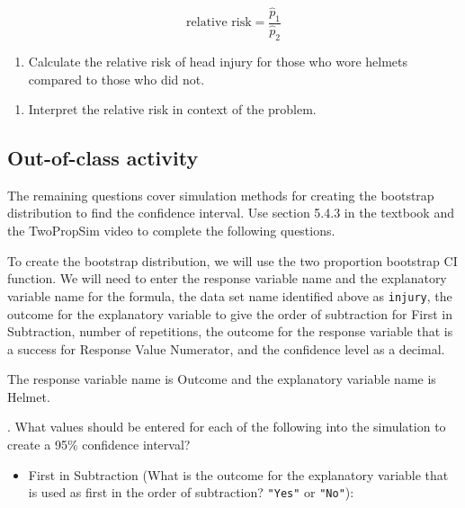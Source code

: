 \documentclass[
]{report}
\providecommand{\tightlist}{%
  \setlength{\itemsep}{0pt}\setlength{\parskip}{0pt}}
\begin{document}
\[\text{relative risk} = \frac{\hat{p}_1}{\hat{p}_2}\]

\begin{enumerate}
\def\labelenumi{\arabic{enumi}.}
\setcounter{enumi}{13}
\tightlist
\item
  Calculate the relative risk of head injury for those who wore helmets compared to those who did not.
\end{enumerate}

\vspace{1in}

\begin{enumerate}
\def\labelenumi{\arabic{enumi}.}
\setcounter{enumi}{14}
\tightlist
\item
  Interpret the relative risk in context of the problem.
\end{enumerate}

\vspace{1in}

\hypertarget{out-of-class-activity-8}{%
\subsection{Out-of-class activity}\label{out-of-class-activity-8}}

The remaining questions cover simulation methods for creating the bootstrap distribution to find the confidence interval. Use section 5.4.3 in the textbook and the TwoPropSim video to complete the following questions.

To create the bootstrap distribution, we will use the two proportion bootstrap CI function. We will need to enter the response variable name and the explanatory variable name for the formula, the data set name identified above as \texttt{injury}, the outcome for the explanatory variable to give the order of subtraction for First in Subtraction, number of repetitions, the outcome for the response variable that is a success for Response Value Numerator, and the confidence level as a decimal.

The response variable name is Outcome and the explanatory variable name is Helmet.


. What values should be entered for each of the following into the simulation to create a 95\% confidence interval?

\vspace{.5mm}

\begin{itemize}
\tightlist
\item
  First in Subtraction (What is the outcome for the explanatory variable that is used as first in the order of subtraction? \texttt{"Yes"} or \texttt{"No"}):
\end{itemize}
\end{document}

